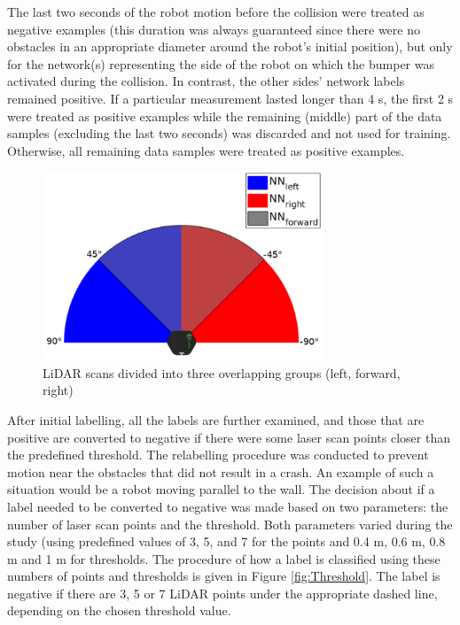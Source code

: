 The last two seconds of the robot motion before the collision were treated as negative examples (this duration was always guaranteed since there were no obstacles in an appropriate diameter around the robot's initial position), but only for the network(s) representing the side of the robot on which the bumper was activated during the collision. In contrast, the other sides' network labels remained positive. If a particular measurement lasted longer than 4 s, the first 2 s were treated as positive examples while the remaining (middle) part of the data samples (excluding the last two seconds) was discarded and not used for training. Otherwise, all remaining data samples were treated as positive examples.

\begin{figure}
    \centering
    \includegraphics[width=0.75\textwidth]{slike/turkish/Fig03.pdf}
    \caption{LiDAR scans divided into three overlapping groups (left, forward, right)}
    \label{fig:Fig03}
\end{figure}

After initial labelling, all the labels are further examined, and those that are positive are converted to negative if there were some laser scan points closer than the predefined threshold. The relabelling procedure was conducted to prevent motion near the obstacles that did not result in a crash. An example of such a situation would be a robot moving parallel to the wall. The decision about if a label needed to be converted to negative was made based on two parameters: the number of laser scan points and the threshold. Both parameters varied during the study (using predefined values of 3, 5, and 7 for the points and 0.4 m, 0.6 m, 0.8 m and 1 m for thresholds. The procedure of how a label is classified using these numbers of points and thresholds is given in Figure \ref{fig:Threshold}. The label is negative if there are 3, 5 or 7 LiDAR points under the appropriate dashed line, depending on the chosen threshold value. 

